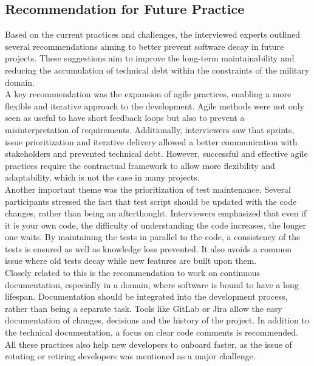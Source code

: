 \subsection{Recommendation for Future Practice}
Based on the current practices and challenges, the interviewed experts outlined several recommendations aiming to better prevent software decay in future projects. These suggestions aim to improve the long-term maintainability
and reducing the accumulation of technical debt within the constraints of the military domain.\\

A key recommendation was the expansion of agile practices, enabling a more flexible and iterative approach to the development. Agile methods were not only seen as useful to have short feedback loops but also to prevent a misinterpretation of requirements.
Additionally, interviewers saw that sprints, issue prioritization and iterative delivery allowed a better communication with stakeholders and prevented technical debt.
However, successful and effective agile practices require the contractual framework to allow more flexibility and adaptability, which is not the case in many projects.\\

Another important theme was the prioritization of test maintenance. Several participants stressed the fact that test script should be updated with the code changes, rather than being an afterthought.
Interviewers emphasized that even if it is your own code, the difficulty of understanding the code increases, the longer one waits. By maintaining the tests in parallel to the code, a consistency of the tests is ensured as well as knowledge loss prevented.
It also avoids a common issue where old tests decay while new features are built upon them.\\

Closely related to this is the recommendation to work on continuous documentation, especially in a domain, where software is bound to have a long lifespan. Documentation should be integrated into the development process, rather than being a separate task.
Tools like GitLab or Jira allow the easy documentation of changes, decisions and the history of the project. In addition to the technical documentation, a focus on clear code comments is recommended.
All these practices also help new developers to onboard faster, as the issue of rotating or retiring developers was mentioned as a major challenge.\\

